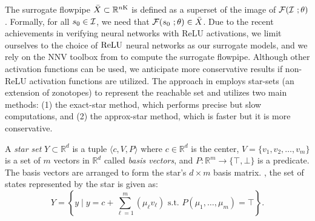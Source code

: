   The surrogate flowpipe $\bar{X}\subset \mathbb{R}^{n\mathrm{K}}$ is defined as a superset of the image of $\mathcal{F}(\mathcal{I}\ ;\theta)$. Formally, for all  $s_0\in \mathcal{I}$, we need that $\mathcal{F}(s_0\ ;\theta) \in \bar{X}$. Due to the recent achievements in verifying neural networks with ReLU activations, we limit ourselves to the choice of $\mathrm{ReLU}$ neural networks as our surrogate models, and we rely on the NNV toolbox from \cite{tran2020nnv} to compute the surrogate flowpipe.  Although other activation functions can be used, we anticipate more conservative results if non-ReLU activation functions are utilized.  The approach in \cite{tran2020nnv} employs star-sets (an extension of zonotopes) to represent the reachable set and utilizes two main methods: (1) the exact-star method, which performs precise but slow computations, and (2) the approx-star method, which is faster but it is more conservative.
\begin{definition}\label{def:star} A \textit{star set} $Y\subset \mathbb{R}^d$ is a tuple $\langle c, V, P \rangle$ where $c \in \mathbb{R}^d$ is the center, $V = \{v_1, v_2, \ldots, v_m \}$ is a set of $m$ vectors in $\mathbb{R}^d$ called \textit{basis vectors}, and $P : \mathbb{R}^m \rightarrow \{\top, \bot\}$ is a predicate. The basis vectors are arranged to form the star's $d \times m$ basis matrix. , the set of states represented by the star is given as:
\begin{equation}
 Y  = \left\{ y \mid y = c + \sum_{\ell=1}^{m} (\mu_\ell v_\ell) \text{ s.t. } P(\mu_1, \ldots, \mu_m) = \top \right\}.     
\end{equation}
\end{definition}


